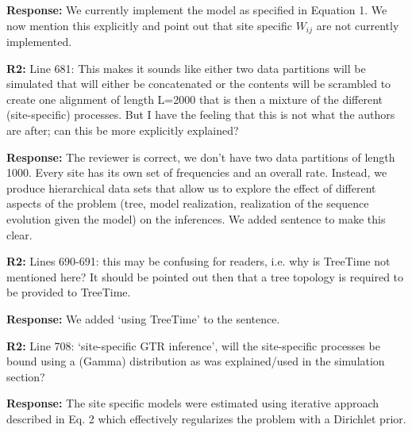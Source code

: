 \documentclass[aps,rmp,onecolumn]{revtex4-1}
\newcommand{\refb}[1]{\textbf{R2:} #1}
\newcommand{\response}[1]{{\color{black}\textbf{Response:} #1}}
\begin{document}
\response{We currently implement the model as specified in Equation 1. We now mention this explicitly and point out that site specific $W_{ij}$ are not currently implemented.}


\refb{Line 681: This makes it sounds like either two data partitions will be simulated that will either be concatenated or the contents will be scrambled to create one alignment of length L=2000 that is then a mixture of the different (site-specific) processes. But I have the feeling that this is not what the authors are after; can this be more explicitly explained?}

\response{The reviewer is correct, we don't have two data partitions of length 1000.
Every site has its own set of frequencies and an overall rate.
Instead, we produce hierarchical data sets that allow us to explore the effect of different aspects of the problem (tree, model realization, realization of the sequence evolution given the model) on the inferences.
We added sentence to make this clear. }


\refb{Lines 690-691: this may be confusing for readers, i.e. why is TreeTime not mentioned here? It should be pointed out then that a tree topology is required to be provided to TreeTime.}

\response{We added `using TreeTime' to the sentence.}

\refb{Line 708: ‘site-specific GTR inference’, will the site-specific processes be bound using a (Gamma) distribution as was explained/used in the simulation section?}

\response{The site specific models were estimated using iterative approach described in Eq. 2 which effectively regularizes the problem with a Dirichlet prior. }
\end{document}
